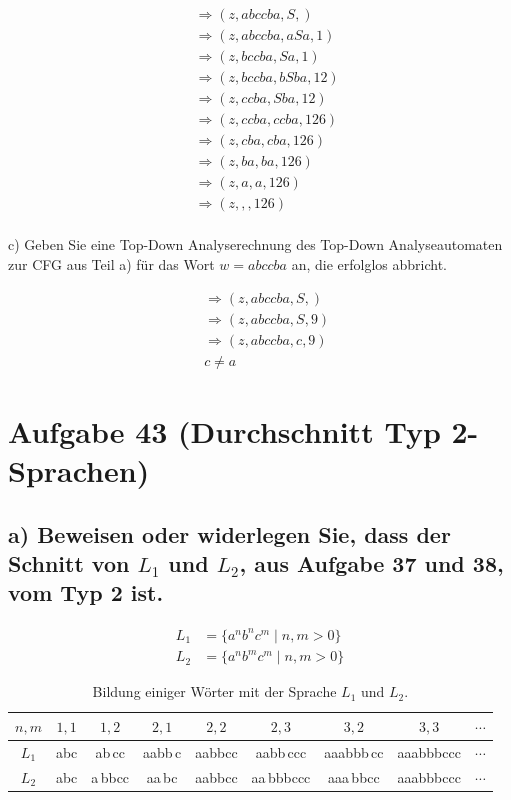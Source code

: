\documentclass{article}
\begin{document}
\begin{equation}
\begin{split}
&\Rightarrow(z, abccba, S, ) \\\ 
&\Rightarrow(z, abccba, aSa, 1) \\\ 
&\Rightarrow(z, bccba, Sa, 1) \\\ 
&\Rightarrow(z, bccba, bSba, 1 2) \\\ 
&\Rightarrow(z, ccba, Sba, 1 2) \\\
&\Rightarrow(z, ccba, ccba, 1 2 6) \\\
&\Rightarrow(z, cba, cba, 1 2 6) \\\
&\Rightarrow(z, ba, ba, 1 2 6) \\\
&\Rightarrow(z, a, a, 1 2 6) \\\
&\Rightarrow(z, , , 1 2 6) \\\
\end{split}
\end{equation}


c) Geben Sie eine Top-Down Analyserechnung des Top-Down Analyseautomaten zur CFG aus Teil a) für das Wort $w=abccba$ an, die erfolglos abbricht.

\begin{equation}
\begin{split}
&\Rightarrow(z, abccba, S, ) \\\ 
&\Rightarrow(z, abccba, S, 9) \\\ 
&\Rightarrow(z, abccba, c, 9) \\\ 
&c \neq a
\end{split}
\end{equation}

\section*{Aufgabe 43 (Durchschnitt Typ 2-Sprachen)}

\subsection*{a) Beweisen oder widerlegen Sie, dass der Schnitt von $L_1$ und $L_2$, aus Aufgabe 37 und 38, vom Typ 2 ist.}

\begin{align}
	L_1 &= \{a^n b^n c^m \mid n, m > 0\} \nonumber\\
	L_2 &= \{a^n b^m c^m \mid n, m > 0\} \nonumber
\end{align}

\begin{table}[H]
	\centering
	\begin{tabular}{|c|c|c|c|c|c|c|c|c|}
		\hline
		$n,m$ & $1,1$ & $1,2$ & $2,1$ & $2,2$ & $2,3$ & $3,2$ & $3,3$ & $\cdots$ \\
		\hline
		$L_1$ & abc & ab\,cc & aabb\,c & aabbcc & aabb\,ccc & aaabbb\,cc & aaabbbccc & $\cdots$ \\
		$L_2$ & abc & a\,bbcc & aa\,bc & aabbcc & aa\,bbbccc & aaa\,bbcc & aaabbbccc & $\cdots$ \\
		\hline
	\end{tabular}
	\caption{Bildung einiger Wörter mit der Sprache $L_1$ und $L_2$.}
	\label{tab:some_words_of_language_one_and_two}
\end{table}
\end{document}
